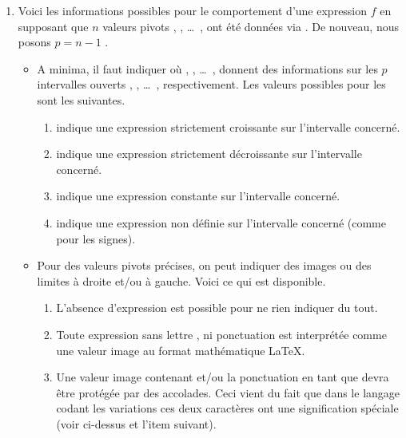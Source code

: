 \documentclass[10pt, a4paper]{article}
\begin{document}
\begin{enumerate}
    \item Voici les informations possibles pour le comportement d'une expression $f$ en supposant que $n$ valeurs pivots  ,  , \dots\ ,  ont été données via  . De nouveau, nous posons $p = n - 1$ .
    \begin{itemize}
        \item A minima, il faut indiquer
        où
         ,  , \dots\ , 
        donnent des informations sur les $p$ intervalles ouverts
        \tdocinlatex{]x_1 ; x_2[} , \tdocinlatex{]x_2 ; x_3[} , \dots\ , \tdocinlatex{]x_p ; x_n[} respectivement.
        Les valeurs possibles pour les  sont les suivantes.
        \begin{enumerate}
            \item \tdocinlatex{<} indique une expression strictement croissante sur l'intervalle concerné.

            \item \tdocinlatex{>} indique une expression strictement décroissante sur l'intervalle concerné.

            \item \tdocinlatex{=} indique une expression constante sur l'intervalle concerné.

            \item {} indique une expression non définie sur l'intervalle concerné (comme pour les signes).
        \end{enumerate}


        \item Pour des valeurs pivots précises, on peut indiquer des images ou des limites à droite et/ou à gauche. Voici ce qui est disponible.
        \begin{enumerate}
            \item L'absence d'expression est possible pour ne rien indiquer du tout.

            \item Toute expression sans lettre , ni ponctuation \tdocinlatex{!} est interprétée comme une valeur image au format mathématique \LaTeX.

            \item Une valeur image contenant  et/ou la ponctuation \tdocinlatex{!} en tant que  devra être protégée par des accolades. Ceci vient du fait que dans le langage codant les variations ces deux caractères ont une signification spéciale (voir ci-dessus et l'item suivant).


\end{enumerate}
\end{itemize}
\end{enumerate}
\end{document}

